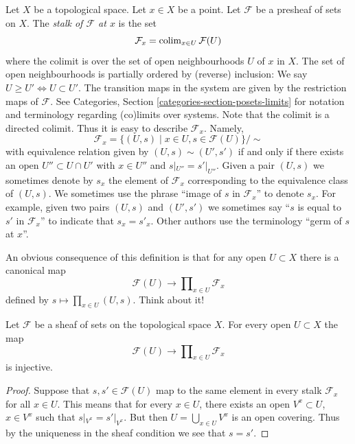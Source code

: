 \noindent
Let $X$ be a topological space. Let $x \in X$ be a point.
Let $\mathcal{F}$ be a presheaf of sets on $X$.
The {\it stalk of $\mathcal{F}$ at $x$} is the set
$$
\mathcal{F}_x
=
\mathop{\mathrm{colim}}\nolimits_{x\in U} \mathcal{F}(U)
$$
where the colimit is over the set of open neighbourhoods
$U$ of $x$ in $X$. The set of open neighbourhoods is
partially ordered by (reverse) inclusion:
We say $U \geq U' \Leftrightarrow U \subset U'$.
The transition maps in the system are
given by the restriction maps of $\mathcal{F}$.
See Categories, Section \ref{categories-section-posets-limits}
for notation and terminology regarding (co)limits over systems.
Note that the colimit is a directed colimit.
Thus it is easy to describe $\mathcal{F}_x$. Namely,
$$
\mathcal{F}_x
=
\{
(U, s)
\mid
x\in U, s\in \mathcal{F}(U)
\}/\sim
$$
with equivalence relation given by $(U, s) \sim (U', s')$ if and only if
there exists an open $U'' \subset U \cap U'$ with $x \in U''$ and
$s|_{U''} = s'|_{U''}$. Given a pair $(U, s)$ we sometimes denote by
$s_x$ the element of $\mathcal{F}_x$ corresponding to the equivalence
class of $(U, s)$. We sometimes use the phrase
``image of $s$ in $\mathcal{F}_x$'' to denote $s_x$.
For example, given two pairs $(U, s)$ and $(U', s')$ we sometimes
say ``$s$ is equal to $s'$ in $\mathcal{F}_x$'' to indicate
that $s_x = s'_x$. Other authors use the terminology
``germ of $s$ at $x$''.

\medskip\noindent
An obvious consequence of this definition is that
for any open $U \subset X$ there is a canonical map
$$
\mathcal{F}(U)
\longrightarrow
\prod\nolimits_{x \in U} \mathcal{F}_x
$$
defined by $s \mapsto \prod_{x \in U} (U, s)$. Think about it!

\begin{lemma}
\label{lemma-sheaf-subset-stalks}
Let $\mathcal{F}$ be a sheaf of sets on the topological space $X$.
For every open $U \subset X$ the map
$$
\mathcal{F}(U)
\longrightarrow
\prod\nolimits_{x \in U} \mathcal{F}_x
$$
is injective.
\end{lemma}

\begin{proof}
Suppose that $s, s' \in \mathcal{F}(U)$ map to the same element
in every stalk $\mathcal{F}_x$ for all $x \in U$. This means that
for every $x \in U$, there exists an open $V^x \subset U$,
$x \in V^x$ such that $s|_{V^x} = s'|_{V^x}$. But then
$U = \bigcup_{x \in U} V^x$ is an open covering. Thus by the
uniqueness in the sheaf condition we see that $s = s'$.
\end{proof}

